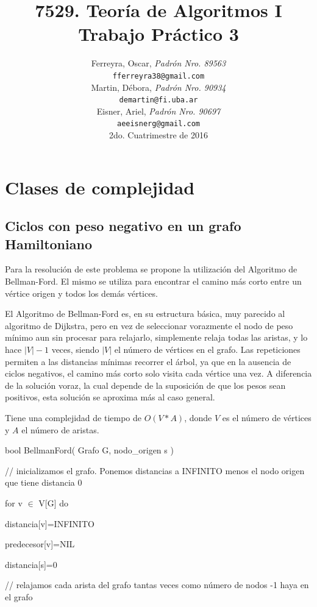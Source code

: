 \documentclass[a4paper,10pt]{article}
\title{
\textbf{ 
	7529. Teoría de Algoritmos I\\
	Trabajo Práctico 3
	}
}
\author{ Ferreyra, Oscar, \textit{Padrón Nro. 89563} \\
\texttt{ fferreyra38@gmail.com } \\[2.5ex]
Martin, Débora, \textit{Padrón Nro. 90934} \\
\texttt{ demartin@fi.uba.ar } \\[2.5ex]
Eisner, Ariel, \textit{Padrón Nro. 90697} \\
\texttt{ aeeisnerg@gmail.com } \\[2.5ex]
\normalsize{2do. Cuatrimestre de 2016} \\
}
\date{}
\begin{document}
\maketitle

\thispagestyle{empty} %
\setcounter{page}{0}
\newpage
\tableofcontents

\newpage

\section{Clases de complejidad}


\subsection{Ciclos con peso negativo en un grafo Hamiltoniano}
Para la resolución de este problema se propone la utilización del Algoritmo de Bellman-Ford. El mismo se utiliza para encontrar el camino más corto entre un vértice origen y todos los demás vértices.

El Algoritmo de Bellman-Ford es, en su estructura básica, muy parecido al algoritmo de Dijkstra, pero en vez de seleccionar vorazmente el nodo de peso mínimo aun sin procesar para relajarlo, simplemente relaja todas las aristas, y lo hace \(|V|-1\) veces, siendo \(|V|\) el número de vértices en el grafo. Las repeticiones permiten a las distancias mínimas recorrer el árbol, ya que en la ausencia de ciclos negativos, el camino más corto solo visita cada vértice una vez. A diferencia de la solución voraz, la cual depende de la suposición de que los pesos sean positivos, esta solución se aproxima más al caso general.

Tiene una complejidad de tiempo de \(O(V*A)\), donde \(V\) es el número de vértices y \(A\) el número de aristas.

\bigskip

bool BellmanFord( Grafo G, nodo\_origen s )

\quad      // inicializamos el grafo. Ponemos distancias a INFINITO menos el nodo origen que tiene distancia 0

\quad       for v \(\in\) V[G] do
           
\quad \quad           distancia[v]=INFINITO
           
\quad\quad           predecesor[v]=NIL
       
\quad       distancia[s]=0
      
\bigskip
\quad       // relajamos cada arista del grafo tantas veces como número de nodos -1 haya en el grafo
       
\end{document}
